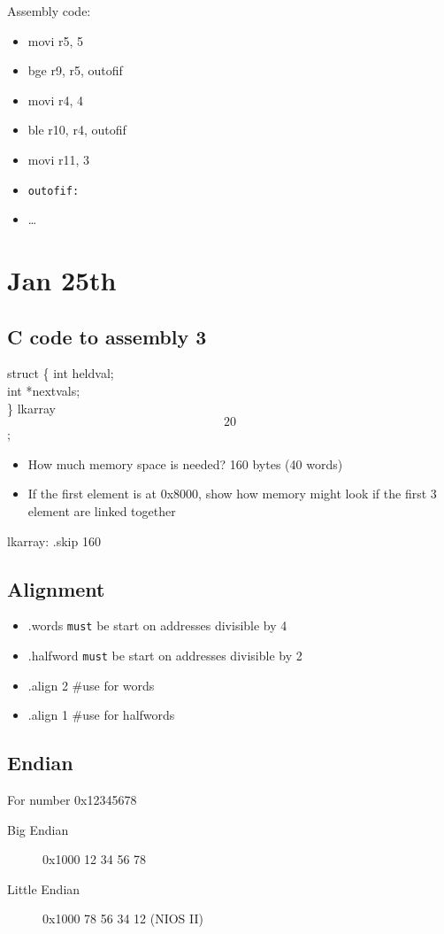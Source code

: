 \documentclass[11pt]{article}
\begin{document}
Assembly code:
\begin{itemize}
\item movi r5, 5
\item bge r9, r5, outofif
\item movi r4, 4
\item ble r10, r4, outofif
\item movi r11, 3
\item \texttt{outofif:}
\item \ldots{}
\end{itemize}
\section{Jan 25th}
\label{sec:orgheadline31}
\subsection{C code to assembly 3}
\label{sec:orgheadline27}
struct \{
  int heldval; \\
  int *nextvals; \\
\} lkarray\[20\]; \\
\begin{itemize}
\item How much memory space is needed? 160 bytes (40 words)
\item If the first element is at 0x8000, show how memory might look if the first 3 element are linked together
\end{itemize}

lkarray: .skip 160

\subsection{Alignment}
\label{sec:orgheadline28}
\begin{itemize}
\item .words \texttt{must} be start on addresses divisible by 4
\item .halfword \texttt{must} be start on addresses divisible by 2
\item .align 2 \#use for words
\item .align 1 \#use for halfwords
\end{itemize}

\subsection{Endian}
\label{sec:orgheadline29}
For number 0x12345678
\begin{description}
\item[{Big Endian}] 0x1000 12 34 56 78
\item[{Little Endian}] 0x1000 78 56 34 12 (NIOS II)
\end{description}
\end{document}
